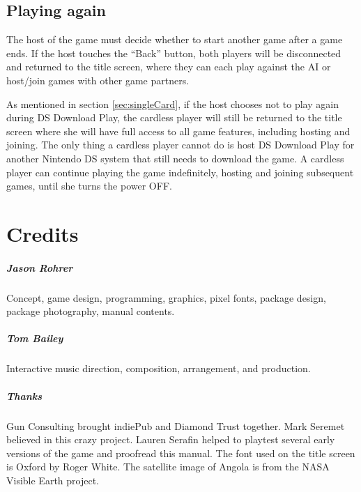 \documentclass[8pt]{extbook}
\makeatletter
\newcommand{\startopenany}{\@openrightfalse}
\newcommand{\stopopenany}{\@openrighttrue}
\makeatother
\begin{document}
\section{Playing again}
The host of the game must decide whether to start another game after a game ends.  If the host touches the ``Back'' button, both players will be disconnected and returned to the title screen, where they can each play against the AI or host/join games with other game partners.

As mentioned in section \ref{sec:singleCard}, if the host chooses not to play again during DS Download Play, the cardless player will still be returned to the title screen where she will have full access to all game features, including hosting and joining.  The only thing a cardless player cannot do is host DS Download Play for another Nintendo DS system that still needs to download the game.  A cardless player can continue playing the game indefinitely, hosting and joining subsequent games, until she turns the power OFF.




\startopenany
\chapter*{Credits}

\paragraph{Jason Rohrer}
Concept, game design, programming, graphics, pixel fonts, package design, package photography, manual contents.

\paragraph{Tom Bailey}
Interactive music direction, composition, arrangement, and production.

\paragraph{Thanks}
Gun Consulting brought indiePub and Diamond Trust together.  Mark Seremet believed in this crazy project.  Lauren Serafin helped to playtest several early versions of the game and proofread this manual.  The font used on the title screen is Oxford by Roger White.  The satellite image of Angola is from the NASA Visible Earth project.

\stopopenany





\end{document}
